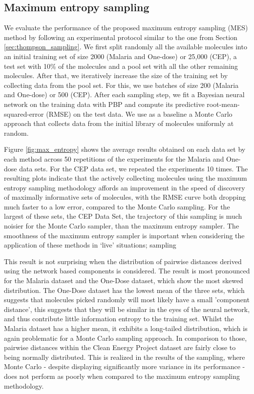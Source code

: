 \subsection{Maximum entropy sampling}

We evaluate the performance of the proposed maximum entropy sampling (MES) method by following an experimental protocol similar to the one from Section \ref{sec:thompson_sampling}. We first split randomly all the available molecules into an initial training set of size 2000 (Malaria and One-dose) or 25,000 (CEP), a test set with 10\% of the molecules and a pool set with all the other remaining molecules. After that, we iteratively increase the size of the training set by collecting data from the pool set. For this, we use batches of size 200 (Malaria and One-dose) or 500 (CEP). After each sampling step, we fit a Bayesian neural network on the training data with PBP and compute its predictive root-mean-squared-error (RMSE) on the test data. We use as a baseline a Monte Carlo approach that collects data from the initial library of molecules uniformly at random.

Figure \ref{fig:max_entropy} shows the average results obtained on each data set by each method across 50 repetitions of the experiments for the Malaria and One-dose data sets. For the CEP data set, we repeated the experiments 10 times. The resulting plots indicate that the actively collecting molecules using the maximum entropy sampling methodology affords an improvement in the speed of discovery of maximally informative sets of molecules, with the RMSE curve both dropping much faster to a low error, compared to the Monte Carlo sampling.  For the largest of these sets, the CEP Data Set, the trajectory of this sampling is much noisier for the Monte Carlo sampler, than the maximum entropy sampler.  The smoothness of the maximum entropy sampler is important when considering the application of these methods in `live' situations; sampling 

This result is not surprising when the distribution of pairwise distances derived using the network based components is considered. The result is most pronounced for the Malaria dataset and the One-Dose dataset, which show the most skewed distribution.  The One-Dose dataset has the lowest mean of the three sets, which suggests that molecules picked randomly will most likely have a small 'component distance', this suggests that they will be similar in the eyes of the neural network, and thus contribute little information entropy to the training set. Whilst the Malaria dataset has a higher mean, it exhibits a long-tailed distribution, which is again problematic for a Monte Carlo sampling approach.  In comparison to those, pairwise distances within the Clean Energy Project dataset are fairly close to being normally distributed.  This is realized in the results of the sampling, where Monte Carlo - despite displaying significantly more variance in its performance - does not perform as poorly when compared to the maximum entropy sampling methodology.


